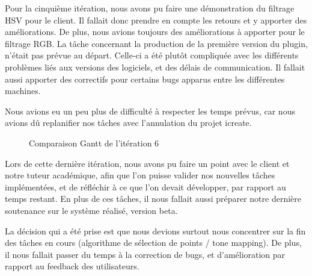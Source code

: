 \documentclass[12pt,titlepage,french]{article}
\begin{document}
Pour la cinquième itération, nous avons pu faire une démonstration du filtrage HSV pour le client. Il fallait donc prendre en compte les retours et y apporter des améliorations. De plus, nous avions toujours des améliorations à apporter pour le filtrage RGB. La tâche concernant la production de la première version du plugin, n'était pas prévue au départ. Celle-ci a été plutôt compliquée avec les différents problèmes liés aux versions des logiciels, et des délais de communication. Il fallait aussi apporter des correctifs pour certains bugs apparus entre les différentes machines. \newline

Nous avions eu un peu plus de difficulté à respecter les temps prévus, car nous avions dû replanifier nos tâches avec l'annulation du projet icreate.

\begin{figure}[H]
    \caption{\label{} Comparaison Gantt de l'itération 6}
\end{figure}

Lors de cette dernière itération, nous avons pu faire un point avec le client et notre tuteur académique, afin que l'on puisse valider nos nouvelles tâches implémentées, et de réfléchir à ce que l'on devait développer, par rapport au temps restant. En plus de ces tâches, il nous fallait aussi préparer notre dernière soutenance sur le système réalisé, version beta. \newline

La décision qui a été prise est que nous devions surtout nous concentrer sur la fin des tâches en cours (algorithme de sélection de points / tone mapping). De plus, il nous fallait passer du temps à la correction de bugs, et d'amélioration par rapport au feedback des utilisateurs. \newline
\end{document}
